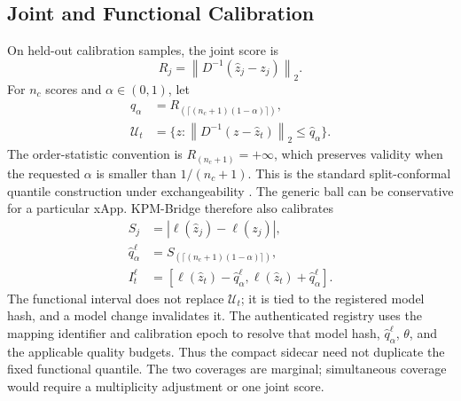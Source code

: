 \documentclass[10pt,journal,twoside]{IEEEtran}
\newcommand{\cU}{\mathcal{U}}
\newcommand{\norm}[1]{\left\lVert #1\right\rVert}
\begin{document}
\subsection{Joint and Functional Calibration}
On held-out calibration samples, the joint score is
\begin{equation}
R_j=\norm{D^{-1}(\hat z_j-z_j)}_2.
\label{eq:joint-score}
\end{equation}
For $n_c$ scores and $\alpha\in(0,1)$, let
\begin{equation}
\begin{aligned}
\hat q_\alpha&=R_{(\lceil(n_c+1)(1-\alpha)\rceil)},\\
\cU_t&=\{z:\norm{D^{-1}(z-\hat z_t)}_2\le\hat q_\alpha\}.
\end{aligned}
\label{eq:conformal-set}
\end{equation}
The order-statistic convention is $R_{(n_c+1)}=+\infty$, which preserves validity when the requested $\alpha$ is smaller than $1/(n_c+1)$.
This is the standard split-conformal quantile construction under exchangeability \cite{vovk2022algorithmic,angelopoulos2023conformal}.
The generic ball can be conservative for a particular xApp. KPM-Bridge therefore also calibrates
\begin{equation}
\begin{aligned}
S_j&=|\ell(\hat z_j)-\ell(z_j)|,\\
\hat q_\alpha^\ell&=S_{(\lceil(n_c+1)(1-\alpha)\rceil)},\\
I_t^\ell&=[\ell(\hat z_t)-\hat q_\alpha^\ell,\ell(\hat z_t)+\hat q_\alpha^\ell].
\end{aligned}
\label{eq:functional-set}
\end{equation}
The functional interval does not replace $\cU_t$; it is tied to the registered model hash, and a model change invalidates it. The authenticated registry uses the mapping identifier and calibration epoch to resolve that model hash, $\hat q_\alpha^\ell$, $\theta$, and the applicable quality budgets. Thus the compact sidecar need not duplicate the fixed functional quantile. The two coverages are marginal; simultaneous coverage would require a multiplicity adjustment or one joint score.
\end{document}
